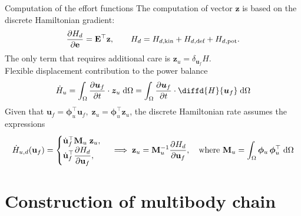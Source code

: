 \documentclass[aspectratio=169]{ISAE-Beamer}
\begin{document}
\begin{frame}{Computation of the effort functions}
The computation of vector $\mathbf{z}$ is based on the discrete Hamiltonian  gradient:
\[
\diffp{H_d}{\mathbf{e}} = \mathbf{E}^\top \mathbf{z}, \qquad H_d = H_{d, \text{kin}}+H_{d, \text{def}}+H_{d, \text{pot}}.
\]
	The only term that requires additional care is $\bm{z}_{u}=\delta_{\bm{u}_f} H$.  \\
	Flexible displacement contribution to the power balance
	\[
	\dot{H}_u = \int_{\Omega} \diffp{\bm{u}_f}{t} \cdot \bm{z}_{u} \d{\Omega} = \int_{\Omega} \diffp{\bm{u}_f}{t} \cdot \diffd{H}{\bm{u}_f} \d{\Omega}
	\]
	Given that $\bm{u}_f = \bm{\phi}_u^\top \mathbf{u}_f, \; \bm{z}_u = \bm{\phi}_u^\top \mathbf{z}_u$, the discrete Hamiltonian rate assumes the expressions
	\begin{equation*}
	\dot{H}_{u, d}(\mathbf{u}_f) = 
	\begin{cases}
	\dot{\mathbf{u}}_f^\top \mathbf{M}_u \; \mathbf{z}_u, \\
	\displaystyle \dot{\mathbf{u}}_f^\top \diffp{H_d}{\mathbf{u}_f},
	\end{cases} \implies \mathbf{z}_u = \mathbf{M}_u^{-1} \diffp{H_d}{\mathbf{u}_f}, \quad \text{where } \mathbf{M}_u=\int_{\Omega} \bm{\phi}_u \, \bm{\phi}_u^\top \d{\Omega}
	\end{equation*}
	
\end{frame}

\section{Construction of multibody chain}
\end{document}
